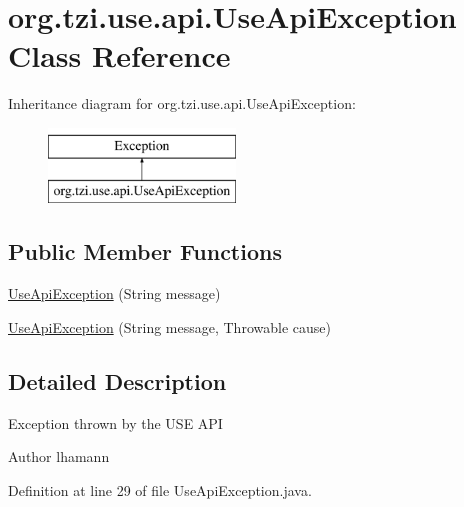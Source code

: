 \hypertarget{classorg_1_1tzi_1_1use_1_1api_1_1_use_api_exception}{\section{org.\-tzi.\-use.\-api.\-Use\-Api\-Exception Class Reference}
\label{classorg_1_1tzi_1_1use_1_1api_1_1_use_api_exception}
}
Inheritance diagram for org.\-tzi.\-use.\-api.\-Use\-Api\-Exception\-:\begin{figure}[H]
\begin{center}
\leavevmode
\includegraphics[height=2.000000cm]{classorg_1_1tzi_1_1use_1_1api_1_1_use_api_exception}
\end{center}
\end{figure}
\subsection*{Public Member Functions}
\begin{DoxyCompactItemize}
\item 
\hyperlink{classorg_1_1tzi_1_1use_1_1api_1_1_use_api_exception_ab10281354c654e3d15742dbde9ee2036}{Use\-Api\-Exception} (String message)
\item 
\hyperlink{classorg_1_1tzi_1_1use_1_1api_1_1_use_api_exception_a4109e7307e6cdd14e6cb8b2159bfd050}{Use\-Api\-Exception} (String message, Throwable cause)
\end{DoxyCompactItemize}


\subsection{Detailed Description}
Exception thrown by the U\-S\-E A\-P\-I \begin{DoxyAuthor}{Author}
lhamann 
\end{DoxyAuthor}


Definition at line 29 of file Use\-Api\-Exception.\-java.



